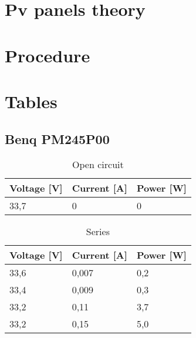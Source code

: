 \documentclass[12pt]{article}
\begin{document}
\section{Pv panels theory}
\section{Procedure}
\section{Tables}
\subsection{Benq PM245P00}
\begin{table}[h]
	\centering
	\begin{tabular}{|p{2cm}|p{2cm}|p{2cm}|}
		\hline
		\rowcolor{RoyalBlue!80} Voltage [V] & Current [A] & Power [W] \\
		\hline
		\rowcolor{Cerulean!70} 33,7         & 0           & 0         \\
		\hline
	\end{tabular}
	\caption{Open circuit}
	\label{tab:my_label}
\end{table}

\begin{table}[h]
	\centering
	\begin{tabular}{|p{2cm}|p{2cm}|p{2cm}|}
		\hline
		\rowcolor{Green!80} Voltage [V] & Current [A] & Power [W] \\
		\hline
		\rowcolor{LimeGreen!70} 33,6    & 0,007       & 0,2       \\
		\hline
		\rowcolor{YellowGreen!70} 33,4  & 0,009       & 0,3       \\
		\hline
		\rowcolor{LimeGreen!70} 33,2    & 0,11        & 3,7       \\
		\hline
		\rowcolor{YellowGreen!70} 33,2  & 0,15        & 5,0       \\
		\hline
	\end{tabular}
	\caption{Series}
	\label{tab:my_label}
\end{table}
\end{document}
